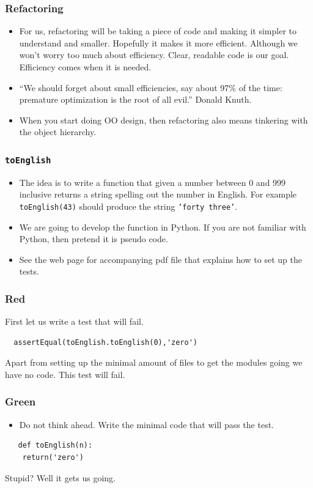 \documentclass{beamer}
\begin{document}
\begin{frame}
  \frametitle{Refactoring}
  \begin{itemize}
  \item For us, refactoring will be taking a piece of code and making
    it simpler to understand and smaller. Hopefully it makes it more
    efficient. Although we won't worry too much about
    efficiency. Clear, readable code is our goal. Efficiency comes when
    it is needed.
  \item ``We should forget about small efficiencies, say about 97\% of
    the time: premature optimization is the root of all evil.'' Donald Knuth.
  \item When you start doing OO design, then refactoring  also means
    tinkering with the object hierarchy.
  \end{itemize}
\end{frame}
\begin{frame}
  \frametitle{{\tt toEnglish}}

  \begin{itemize}
  \item  The idea is to write a function that given a number between 0 and 999
inclusive returns a string spelling out the number in English. For
example {\tt toEnglish(43)} should produce the string {\tt 'forty
  three'}. 
\item We are going to develop the function in Python. If you are
not familiar with Python, then  pretend it is pseudo code.
\item See the web page for accompanying pdf file that explains how to
  set up the tests. 
  \end{itemize}
\end{frame}
\begin{frame}[fragile]
  \frametitle{Red}
  First let us  write a test that will fail.
  \color{red}
\begin{lstlisting}
  assertEqual(toEnglish.toEnglish(0),'zero')
\end{lstlisting}
\color{black}
Apart from setting up the minimal amount of files to get the modules
going we have no code. This test will fail.
\end{frame}
\begin{frame}[fragile]
  \frametitle{Green}
  \begin{itemize}
  \item Do not think ahead. Write the minimal code that will pass the test.
  \end{itemize}
  \begin{lstlisting}
   def toEnglish(n):
    return('zero')
  \end{lstlisting}
Stupid? Well it gets us going.
\end{frame}
\end{document}

